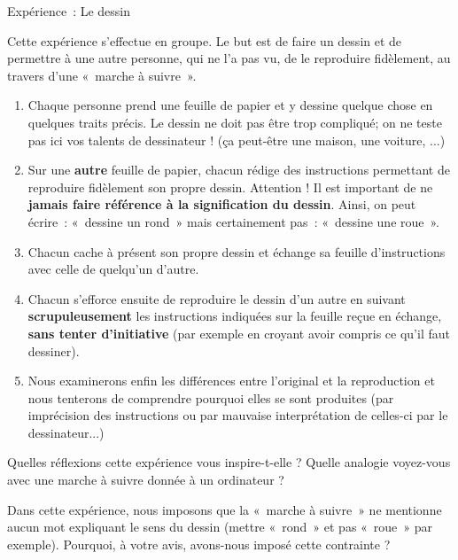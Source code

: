 		\begin{Emphase}[exercice]{Expérience~: Le dessin}

			Cette expérience s'effectue en groupe.
			Le but est de faire un dessin et de permettre à une autre personne, qui
			ne l'a pas vu, de le reproduire fidèlement, au travers
			d'une «~marche à suivre~».

			\begin{enumerate}
			\item
				Chaque personne prend une feuille de papier et 
				y dessine quelque chose en quelques traits précis. 
				Le dessin ne doit pas être trop compliqué; 
				on ne teste pas ici vos talents de dessinateur ! 
				(ça peut-être une maison, une voiture, ...)
			\item
				Sur une \textbf{autre} feuille de papier, 
				chacun rédige des instructions permettant de 
				reproduire fidèlement son propre dessin. 
				Attention ! Il est important de ne
				\textbf{jamais faire référence à la signification du dessin}. 
				Ainsi, on peut écrire~: «~dessine un rond~» 
				mais certainement pas~: «~dessine une roue~».
			\item
				Chacun cache à présent son propre dessin et échange 
				sa feuille d'instructions avec celle de quelqu'un d'autre.
			\item
				Chacun s'efforce ensuite de reproduire le dessin d'un autre 
				en suivant \textbf{scrupuleusement} les instructions indiquées 
				sur la feuille reçue en échange, \textbf{sans tenter
				d'initiative} (par exemple en croyant avoir compris ce
				qu'il faut dessiner).
			\item
				Nous examinerons enfin les différences entre l'original et 
				la reproduction et nous tenterons de comprendre pourquoi 
				elles se sont produites (par imprécision des instructions ou
				par mauvaise interprétation de celles-ci par le dessinateur...)
			\end{enumerate}

		\end{Emphase}

\bigskip
		Quelles réflexions cette expérience vous inspire-t-elle ?
		Quelle analogie voyez-vous avec une marche à suivre donnée à un
		ordinateur ?

		Dans cette expérience, nous imposons que la «~marche à suivre~» ne mentionne
		aucun mot expliquant le sens du dessin (mettre «~rond~» et pas «~roue~»
		par exemple). Pourquoi, à votre avis, avons-nous imposé cette
		contrainte ?

